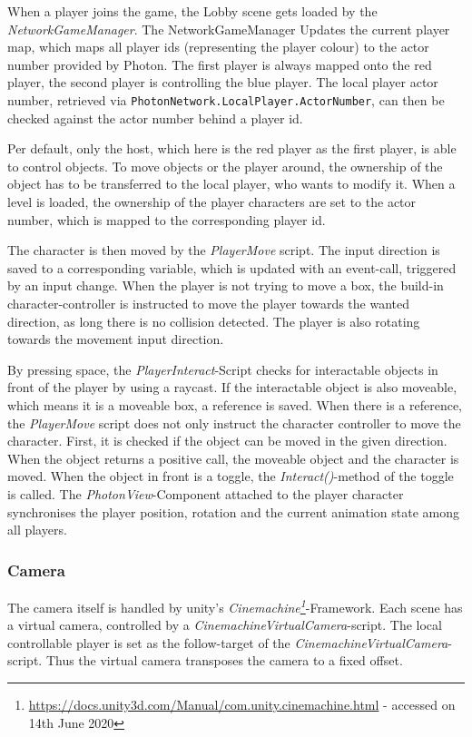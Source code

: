 When a player joins the game, the Lobby scene gets loaded by the \textit{NetworkGameManager}. The NetworkGameManager Updates the current player map, which maps all player ids (representing the player colour) to the actor number provided by Photon. The first player is always mapped onto the red player, the second player is controlling the blue player.
The local player actor number, retrieved via \texttt{PhotonNetwork.LocalPlayer.ActorNumber}, can then be checked against the actor number behind a player id.

Per default, only the host, which here is the red player as the first player, is able to control objects. To move objects or the player around, the ownership of the object has to be transferred to the local player, who wants to modify it.
When a level is loaded, the ownership of the player characters are set to the actor number, which is mapped to the corresponding player id.

The character is then moved by the \textit{PlayerMove} script.
The input direction is saved to a corresponding variable, which is updated with an event-call, triggered by an input change. When the player is not trying to move a box, the build-in character-controller is instructed to move the player towards the wanted direction, as long there is no collision detected.
The player is also rotating towards the movement input direction.

By pressing space, the \textit{PlayerInteract}-Script checks for interactable objects in front of the player by using a raycast. If the interactable object is also moveable, which means it is a moveable box, a reference is saved.
When there is a reference, the \textit{PlayerMove} script does not only instruct the character controller to move the character. First, it is checked if the object can be moved in the given direction. When the object returns a positive call, the moveable object and the character is moved.
When the object in front is a toggle, the \textit{Interact()}-method of the toggle is called.
The \textit{PhotonView}-Component attached to the player character synchronises the player position, rotation and the current animation state among all players.


\subsubsection{Camera}

The camera itself is handled by unity's \textit{Cinemachine\footnote{\url{https://docs.unity3d.com/Manual/com.unity.cinemachine.html} - accessed on 14th June 2020}}-Framework.
Each scene has a virtual camera, controlled by a \textit{CinemachineVirtualCamera}-script. The local controllable player is set as the follow-target of the \textit{CinemachineVirtualCamera}-script.
Thus the virtual camera transposes the camera to a fixed offset.

